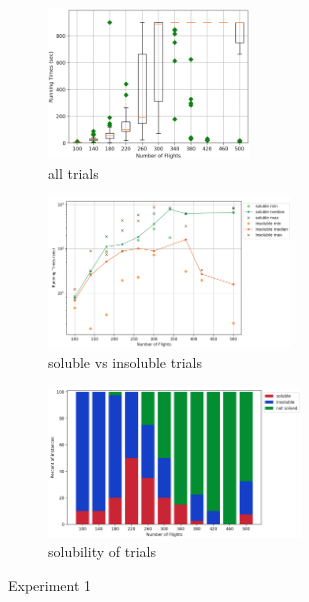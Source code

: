 \documentclass{mpaper}
\begin{document}
\begin{figure}[!ht]
    \centering
    \begin{subfigure}[b]{0.30\textwidth}
        \includegraphics[width=\textwidth, height=4cm]{images/experiments/varym/varyM.png}
        \caption{all trials}
        \label{fig:exp1all}
    \end{subfigure}
    \begin{subfigure}[b]{0.36\textwidth}
        \includegraphics[width=\textwidth, height=4cm]{images/experiments/varym/satunsat_m.png}
        \caption{soluble vs insoluble trials}
        \label{fig:exp1sat}
    \end{subfigure}
    \begin{subfigure}[b]{0.32\textwidth}
        \includegraphics[width=\textwidth, height=4cm]{images/experiments/varym/varyMsat.png}
        \caption{solubility of trials}
        \label{fig:varymsat}
    \end{subfigure}
    \caption{Experiment 1}
    \label{experiment1}
\end{figure}
\vspace{-1mm}
\end{document}
